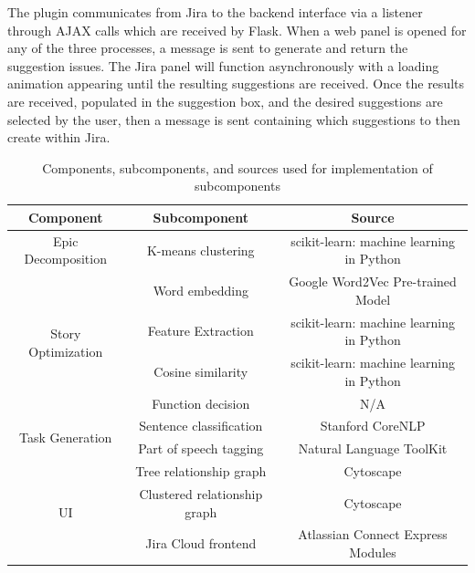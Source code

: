 The plugin communicates from Jira to the backend interface via a listener through AJAX calls which are received by Flask. When a web panel is opened for any of the three processes, a message is sent to generate and return the suggestion issues. The Jira panel will function asynchronously with a loading animation appearing until the resulting suggestions are received. Once the results are received, populated in the suggestion box, and the desired suggestions are selected by the user, then a message is sent containing which suggestions to then create within Jira.

\begin{center}
\begin{table}
\caption{Components, subcomponents, and sources used for implementation of subcomponents}
\begin{tabular}{ |c|c|c| } 
\hline
\multicolumn{1}{|c|}{\textbf{Component}} & \multicolumn{1}{c|}{\textbf{Subcomponent}} & \multicolumn{1}{c|}{\textbf{Source}} \\
\hline
Epic Decomposition & K-means clustering & scikit-learn: machine learning in Python \\
\hline
\multirow{4}{*}{Story Optimization} & Word embedding & Google Word2Vec Pre-trained Model \\ 
\cline{2-3}
& Feature Extraction & scikit-learn: machine learning in Python \\ 
\cline{2-3}
& Cosine similarity & scikit-learn: machine learning in Python \\
\cline{2-3}
& Function decision &N/A \\ 
\hline
\multirow{2}{*}{Task Generation} & Sentence classification & Stanford CoreNLP \\ 
\cline{2-3}
& Part of speech tagging & Natural Language ToolKit \\ 
\hline
\multirow{3}{*}{UI} & Tree relationship graph & Cytoscape \\ 
\cline{2-3}
& Clustered relationship graph & Cytoscape \\ 
\cline{2-3}
& Jira Cloud frontend & Atlassian Connect Express Modules \\ 
\hline
\end{tabular}
\end{table}
\end{center}